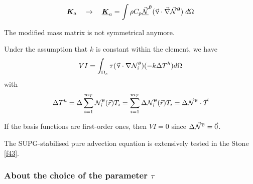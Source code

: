 \[
{\bm K}_a \quad \rightarrow  \quad \underline{\bm K}_a 
= \int \rho C_p \vec{\underline{{\mathcal{N}}}}^\uptheta ({\vec \upnu}\cdot \vec\nabla \vec{{\mathcal{N}}}^\uptheta) \; d\Omega
\]

\begin{remark} 
The modified mass matrix is not symmetrical anymore.
\end{remark} 

Under the assumption that $k$ is constant within the element, we have 
\[
VI = \int_{\Omega_e} \tau(\vec\upnu\cdot\nabla {\mathcal{N}}_i^\theta)(- k \Delta T^h ) d\Omega 
\]
with 
\[
\Delta T^h 
= \Delta \sum_{i=1}^{m_T} {\mathcal{N}}^\uptheta_i ({\vec r}) T_i 
= \sum_{i=1}^{m_T} \Delta {\mathcal{N}}^\uptheta_i ({\vec r}) T_i 
= \Delta \vec {{\mathcal{N}}}^\uptheta \cdot \vec T
\]

\begin{remark}
If the basis functions are first-order ones, then $VI=0$ since $\Delta \vec {{\mathcal{N}}}^\uptheta = \vec 0$.  
\end{remark}

The SUPG-stabilised pure advection equation is extensively tested in the Stone \ref{f43}.


\subsubsection{About the choice of the parameter $\tau$}\label{ss:tausupg}

